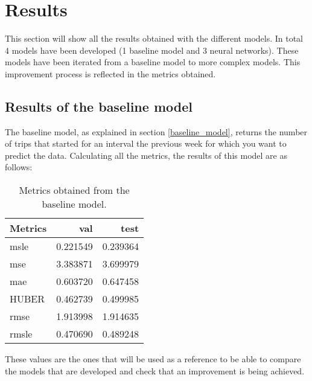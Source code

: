 \section{Results}\label{results}

This section will show all the results obtained with the different models. In total 4 models have been developed (1 baseline model and 3 neural networks). These models have been iterated from a baseline model to more complex models. This improvement process is reflected in the metrics obtained.




\subsection{Results of the baseline model}

The baseline model, as explained in section \ref{baseline_model}, returns the number of trips that started for an interval the previous week for which you want to predict the data. Calculating all the metrics, the results of this model are as follows:

\begin{table}[H]
    \centering
    \begin{tabular}{l|rr}
    \toprule
    Metrics &      val &      test \\
    \midrule
    
    \acrshort{msle} &  0.221549 &  0.239364 \\
    \acrshort{mse} &  3.383871 &  3.699979 \\
    \acrshort{mae} &  0.603720 &  0.647458 \\
    HUBER &  0.462739 &  0.499985 \\
    \acrshort{rmse} &  1.913998 &  1.914635 \\
    \acrshort{rmsle} &  0.470690 &  0.489248 \\
    \bottomrule
    \end{tabular}
    \caption{Metrics obtained from the baseline model.}
\end{table}

These values are the ones that will be used as a reference to be able to compare the models that are developed and check that an improvement is being achieved.




